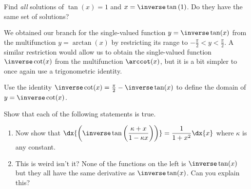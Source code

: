 \begin{embeddedproblem}
  \vskip-2mm{}
  Find \emph{all} solutions of  $\tan(x)=1$ and
  $x=\inverse\tan\left(1\right)$. Do they have the same set of
  solutions?\\
\end{embeddedproblem}

\vskip-2mm{}
We obtained our branch for the single-valued function $y=\inverse\tan(x)$
from the multifunction $y=\arctan(x)$ by restricting its  range to
$-\frac{\pi}{2}\lt y\lt\frac{\pi}{2}$. A similar restriction would
allow us to obtain the single-valued
function $\inverse\cot(x)$ from the multifunction $\arccot(x)$, but it
is a bit simpler to once again use a trigonometric  identity.

\begin{ProficiencyDrill-1line}
  Use the identity $\inverse\cot(x) = \frac{\pi}{2}-\inverse\tan(x)$
  to define the domain of $y=\inverse\cot(x)$.
\end{ProficiencyDrill-1line}

\begin{embeddedproblem}
  Show that each of the following statements is true.
  \begin{enumerate}[label={\bf{}(\alph*)}]
  \item Now show that
    $\dx{\left(\inverse\tan\left(\dfrac{\kappa+x}{1-\kappa x}\right)\right)}
    = \dfrac{1}{1+x^2}\dx{x}$ where $\kappa$ is any constant.
  \item This is weird isn't it? None of the functions on the left is
    $\inverse\tan(x)$  but they all have the same derivative as $\inverse\tan(x)$. Can you
    explain this?
  \end{enumerate}
  \vskip-6mm{}
\end{embeddedproblem}



